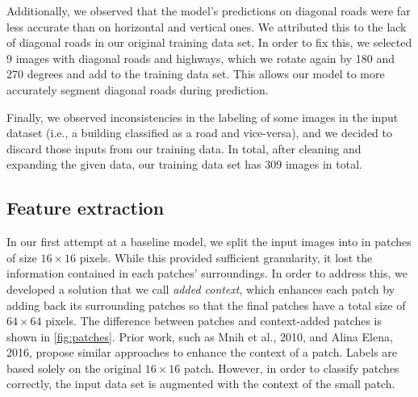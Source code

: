 \documentclass[10pt,conference,compsocconf]{IEEEtran}
\begin{document}
Additionally, we observed that the model's predictions on diagonal roads were
far less accurate than on horizontal and vertical ones. We attributed this
to the lack of diagonal roads in our original training data set. In order to
fix this, we selected 9 images with diagonal roads and highways, which we
rotate again by 180 and 270 degrees and add to the training data set. This
allows our model to more accurately segment diagonal roads during prediction.

Finally, we observed inconsistencies in the labeling of some images in the
input dataset (i.e., a building classified as a road and vice-versa), and we
decided to discard those inputs from our training data. In total, after
cleaning and expanding the given data, our training data set has 309 images
in total.

\subsection{Feature extraction}
\label{sec:feature}
In our first attempt at a baseline model, we split the input images into in
patches of size $16\times16$ pixels. While this provided sufficient
granularity, it lost the information contained in each patches' surroundings.
In order to address this, we developed a solution that we call \textit{added
context}, which enhances each patch by adding back its surrounding patches so
that the final patches have a total size of $64\times64$ pixels. The difference
between patches and context-added patches is shown in \ref{fig:patches}. Prior
work, such as Mnih et al., 2010, \cite{Mnih2010} and Alina Elena, 2016,
\cite{mthesis} propose similar approaches to enhance the context of a
patch. Labels are based solely on the original $16\times16$ patch. However, in
order to classify patches correctly, the input data set is augmented with the
context of the small patch. 
\end{document}
